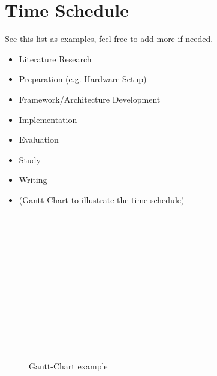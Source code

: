 \documentclass[]{hci-proposal}
\begin{document}
\section{Time Schedule}
See this list as examples, feel free to add more if needed.
\begin{itemize}
\item Literature Research
\item Preparation (e.g. Hardware Setup)
\item Framework/Architecture Development
\item Implementation
\item Evaluation
\item Study
\item Writing
\item (Gantt-Chart to illustrate the time schedule)
\end{itemize}


\begin{landscape}
  \begin{figure*}[htbp]
    \begin{ganttchart}[vgrid, hgrid, y unit chart=0.7cm]{1}{24}
       \\
       \\

       \\
       \\
       \\
       \\
       \\

       \\
       \\
       \\
       \\
    \end{ganttchart}
    \label{gc}
    \caption{Gantt-Chart example}
  \end{figure*}
\end{landscape}
\end{document}
